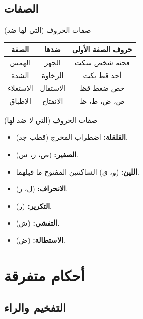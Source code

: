 \documentclass[aspectratio=169, 12pt]{beamer}
\begin{document}
\subsection{الصفات}
\begin{frame}{صفات الحروف (التي لها ضد)}
    \begin{table}
        \centering
        \scriptsize
        \begin{tabular}{|c|c|c|}
            \hline
            \textbf{الصفة} & \textbf{ضدها} & \textbf{حروف الصفة الأولى} \\
            \hline
            الهمس & الجهر & فحثه شخص سكت \\
            \hline
            الشدة & الرخاوة & أجد قط بكت \\
            \hline
            الاستعلاء & الاستفال & خص ضغط قظ \\
            \hline
            الإطباق & الانفتاح & ص، ض، ط، ظ \\
            \hline
        \end{tabular}
    \end{table}
\end{frame}

\begin{frame}{صفات الحروف (التي لا ضد لها)}
    \begin{itemize}
        \item \textbf{القلقلة:} اضطراب المخرج (قطب جد).
        \item \textbf{الصفير:} (ص، ز، س).
        \item \textbf{اللين:} (و، ي) الساكنتين المفتوح ما قبلهما.
        \item \textbf{الانحراف:} (ل، ر).
        \item \textbf{التكرير:} (ر).
        \item \textbf{التفشي:} (ش).
        \item \textbf{الاستطالة:} (ض).
    \end{itemize}
\end{frame}

\section{أحكام متفرقة}
\subsection{التفخيم والراء}
\end{document}
